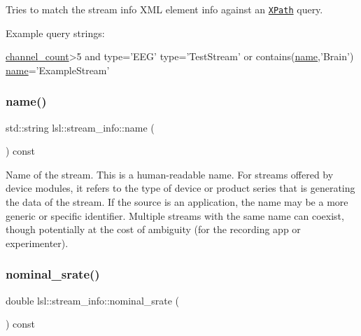 Tries to match the stream info X\+ML element {\ttfamily info} against an \href{https://en.wikipedia.org/wiki/XPath#Syntax_and_semantics_(XPath_1.0)}{\tt X\+Path} query.

Example query strings\+: 
\begin{DoxyCode}
\hyperlink{classlsl_1_1stream__info_acf09957c1c61a9d9e0f9439037eec305}{channel\_count}>5 and type=\textcolor{stringliteral}{'EEG'}
type=\textcolor{stringliteral}{'TestStream'} or contains(\hyperlink{classlsl_1_1stream__info_a0862e5c580d65ecf9ceb1fcc26f2ca34}{name},\textcolor{stringliteral}{'Brain'})
\hyperlink{classlsl_1_1stream__info_a0862e5c580d65ecf9ceb1fcc26f2ca34}{name}='ExampleStream'
\end{DoxyCode}
 \mbox{\label{classlsl_1_1stream__info_a0862e5c580d65ecf9ceb1fcc26f2ca34}} 
\subsubsection{\texorpdfstring{name()}{name()}}
{\footnotesize\ttfamily std\+::string lsl\+::stream\+\_\+info\+::name (\begin{DoxyParamCaption}{ }\end{DoxyParamCaption}) const\hspace{0.3cm}{\ttfamily [inline]}}

Name of the stream. This is a human-\/readable name. For streams offered by device modules, it refers to the type of device or product series that is generating the data of the stream. If the source is an application, the name may be a more generic or specific identifier. Multiple streams with the same name can coexist, though potentially at the cost of ambiguity (for the recording app or experimenter). \mbox{\label{classlsl_1_1stream__info_a35b9b9b8947915f9f9518333342e2835}} 
\subsubsection{\texorpdfstring{nominal\+\_\+srate()}{nominal\_srate()}}
{\footnotesize\ttfamily double lsl\+::stream\+\_\+info\+::nominal\+\_\+srate (\begin{DoxyParamCaption}{ }\end{DoxyParamCaption}) const\hspace{0.3cm}{\ttfamily [inline]}}

